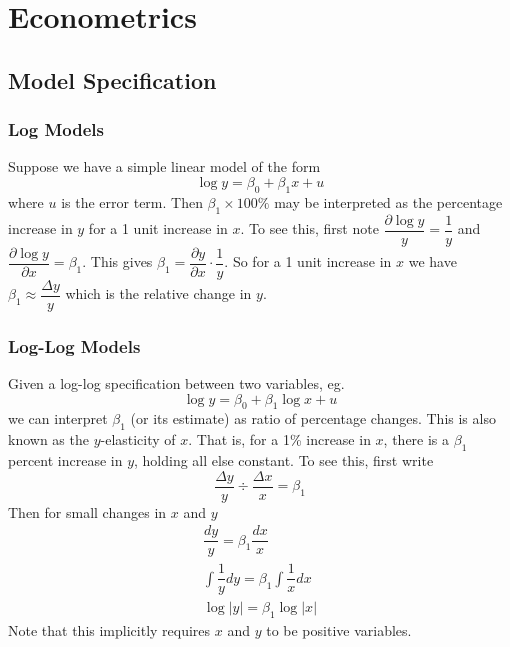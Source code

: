 \documentclass[11pt]{report} %
\begin{document}
\chapter{Econometrics}

\section{Model Specification}

\subsection{Log Models}

Suppose we have a simple linear model of the form
\begin{equation}
\log y = \beta_{0} + \beta_{1}x + u
\end{equation}
where $u$ is the error term. Then $\beta_{1}\times 100\%$ may be interpreted as the percentage increase in $y$ for a 1 unit increase in $x$. To see this, first note $\dfrac{\partial \log y}{y} = \dfrac{1}{y}$ and $\dfrac{\partial \log y}{\partial x} = \beta_{1}$. This gives $\beta_{1} = \dfrac{\partial y}{\partial x}\cdot\dfrac{1}{y}$. So for a 1 unit increase in $x$ we have $\beta_{1} \approx \dfrac{\Delta y}{y}$ which is the relative change in $y$.

\subsection{Log-Log Models}

Given a log-log specification between two variables, eg.
\begin{equation}
\log y = \beta_{0} + \beta_{1}\log x + u
\end{equation}
we can interpret $\beta_{1}$ (or its estimate) as ratio of percentage changes. This is also known as the $y$-elasticity of $x$. That is, for a 1\% increase in $x$, there is a $\beta_{1}$ percent increase in $y$, holding all else constant. To see this, first write
\begin{equation}
\dfrac{\Delta y}{y} \div \dfrac{\Delta x}{x} = \beta_{1} 
\end{equation}
Then for small changes in $x$ and $y$
\begin{gather}
\dfrac{dy}{y} = \beta_{1}\dfrac{dx}{x} \\
\int\dfrac{1}{y}dy = \beta_{1}\int\dfrac{1}{x}dx \\
\log\left|y\right| = \beta_{1}\log\left|x\right|
\end{gather}
Note that this implicitly requires $x$ and $y$ to be positive variables.
\end{document}
